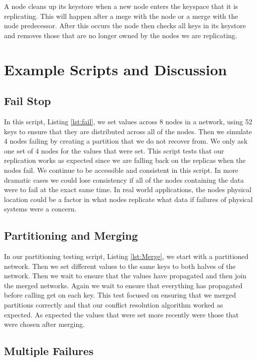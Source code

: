 \documentclass[11pt]{article}
\begin{document}
A node cleans up its keystore when a new node enters the keyspace that it is replicating. This will happen after a mege with the node or a merge with the node predecessor. After this occurs the node then checks all keys in its keystore and removes those that are no longer owned by the nodes we are replicating.

\section{Example Scripts and Discussion}\label{sec:Ex}

\subsection{Fail Stop}

In this script, Listing \ref{lst:fail}, we set values across 8 nodes in a network, using 52 keys to ensure that they are distributed across all of the nodes. Then we simulate 4 nodes failing by creating a partition that we do not recover from. We only ask one set of 4 nodes for the values that were set. This script tests that our replication works as expected since we are falling back on the replicas when the nodes fail. We continue to be accessible and consistent in this script. In more dramatic cases we could lose consistency if all of the nodes containing the data were to fail at the exact same time. In real world applications, the nodes physical location could be a factor in what nodes replicate what data if failures of physical systems were a concern.

\subsection{Partitioning and Merging}

In our partitioning testing script, Listing \ref{lst:Merge}, we start with a partitioned network. Then we set different values to the same keys to both halves of the network. Then we wait to ensure that the values have propagated and then join the merged networks. Again we wait to ensure that everything has propagated before calling get on each key. This test focused on ensuring that we merged partitions correctly and that our conflict resolution algorithm worked as expected. As expected the values that were set more recently were those that were chosen after merging.

\subsection{Multiple Failures}
\end{document}
